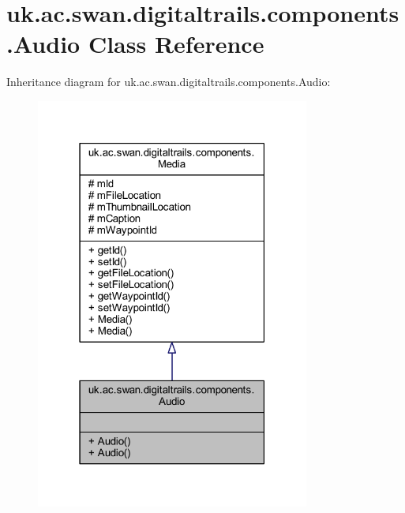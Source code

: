 \hypertarget{classuk_1_1ac_1_1swan_1_1digitaltrails_1_1components_1_1_audio}{\section{uk.\+ac.\+swan.\+digitaltrails.\+components.\+Audio Class Reference}
\label{classuk_1_1ac_1_1swan_1_1digitaltrails_1_1components_1_1_audio}
}


Inheritance diagram for uk.\+ac.\+swan.\+digitaltrails.\+components.\+Audio\+:
\nopagebreak
\begin{figure}[H]
\begin{center}
\leavevmode
\includegraphics[width=255pt]{classuk_1_1ac_1_1swan_1_1digitaltrails_1_1components_1_1_audio__inherit__graph}
\end{center}
\end{figure}


